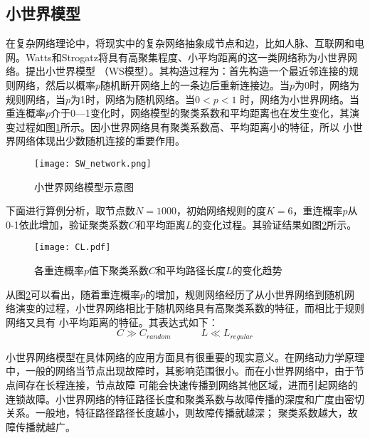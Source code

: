 \subsection{小世界模型}
\label{sec:windEffects}
在复杂网络理论中，将现实中的复杂网络抽象成节点和边，比如人脉、互联网和电网。Watts和Strogatz将具有高聚集程度、小平均距离的这一类网络称为小世界网络\cite{refsWS}。提出小世界模型
（WS模型）。其构造过程为：首先构造一个最近邻连接的规则网络，然后以概率$p$随机断开网络上的一条边后重新连接边。当$p$为0时，网络为规则网络，当$p$为1时，网络为随机网络。当$0<p<1$
时，网络为小世界网络。当重连概率$p$介于0—1变化时，网络模型的聚类系数和平均距离也在发生变化，其演变过程如图\ref{fig:SW}所示。因小世界网络具有聚类系数高、平均距离小的特征，所以
小世界网络体现出少数随机连接的重要作用。
\begin{figure}[H] %
    \centering
    \texttt{[image: SW\_network.png]}
    \caption{小世界网络模型示意图}
    \label{fig:SW}
  \end{figure}

下面进行算例分析，取节点数$N = 1000$，初始网络规则的度$K = 6$，重连概率$p$从0-1依此增加，验证聚类系数$C$和平均距离$L$的变化过程。其验证结果如图\ref{fig:CL}所示。
\begin{figure}[H] %
    \centering
    \texttt{[image: CL.pdf]}
    \caption{各重连概率$p$值下聚类系数$C$和平均路径长度$L$的变化趋势}
    \label{fig:CL}
\end{figure}

从图\ref{fig:CL}可以看出，随着重连概率$p$的增加，规则网络经历了从小世界网络到随机网络演变的过程，小世界网络相比于随机网络具有高聚类系数的特征，而相比于规则网络又具有
小平均距离的特征。其表达式如下：
\begin{equation}
\label{equ:chap2:CL}
 C\gg C_{random} \quad \quad\quad L \ll L_{regular}
\end{equation}

小世界网络模型在具体网络的应用方面具有很重要的现实意义。在网络动力学原理中，一般的网络当节点出现故障时，其影响范围很小。而在小世界网络中，由于节点间存在长程连接，节点故障
可能会快速传播到网络其他区域，进而引起网络的连锁故障。小世界网络的特征路径长度和聚类系数与故障传播的深度和广度由密切关系。一般地，特征路径路径长度越小，则故障传播就越深；
聚类系数越大，故障传播就越广\cite{refs41}。

